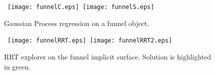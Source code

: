 \begin{figure}[h]
    \centering
    \mbox
    {
        \texttt{[image: funnelC.eps]}
        \texttt{[image: funnelS.eps]}
    }
    \caption{Gaussian Process regression on a funnel object. }
    \label{fig:GPfunnel}
\end{figure}
\begin{figure}[h]
    \centering
    \mbox
    {
    \texttt{[image: funnelRRT.eps]}
    \texttt{[image: funnelRRT2.eps]}
    }
    \caption{RRT explorer on the funnel implicit surface. Solution is highlighted in green.}
    \label{fig:RRTfunnel}
\end{figure}


























